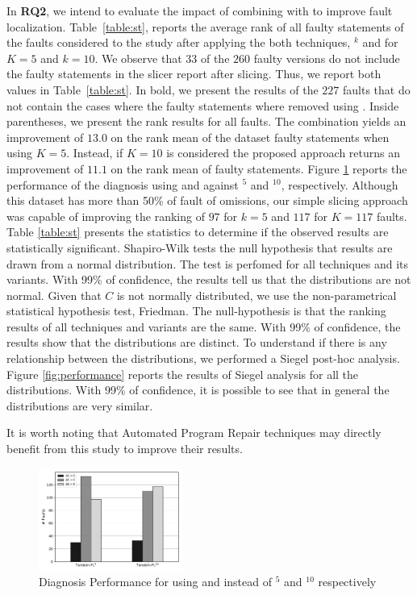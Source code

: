 \documentclass{article}
\begin{document}
In \textbf{RQ2}, we intend to evaluate the impact of combining \ds{} with \sfl{}
to improve fault localization. Table~\ref{table:st}, reports the average rank of all faulty
statements of the \dfj{} faults considered to the study after applying the both
techniques, \sfl{}$^{k}$ and  for $K=5$ and $k=10$. We observe that
$33$ of the $260$ 
faulty versions do not include the faulty statements in the slicer report after slicing.
Thus, we report both values in Table~\ref{table:st}. In bold, we present the
results of the $227$ faults that do not contain the cases where the faulty
statements where removed using . Inside parentheses, we present the
rank results for all faults. The  combination yields an improvement
of $13.0$ on the rank mean of the dataset faulty statements when using $K=5$.
Instead, if $K=10$ is considered the proposed approach returns an improvement of
$11.1$ on the rank mean of faulty statements.
 Figure \ref{fig:diagnosis} reports the performance of the diagnosis
using  and  against \sfl{}$^{5}$ and \sfl{}$^{10}$,
respectively. Although this dataset has more than 50\% of fault of omissions,
our simple slicing approach was capable of improving the ranking of $97$ for
$k=5$ and $117$ for $K=117$ faults. Table \ref{table:st} presents the statistics
to determine if the observed results are statistically significant. Shapiro-Wilk
tests the null hypothesis that results are drawn from a normal distribution. The
test is perfomed for all techniques and its variants. With 99\% of confidence,
the results tell us that the distributions are not normal. Given that $C$ is not
normally distributed, we use the non-parametrical statistical hypothesis test,
Friedman. The null-hypothesis is that the ranking results of all techniques and
variants are the same. With 99\% of confidence, the results show that the
distributions are distinct. To understand if there is any relationship
between the distributions, 
we performed a Siegel post-hoc analysis. Figure
\ref{fig:performance} reports the results of Siegel analysis for all the
distributions. With 99\% of confidence, it is possible to see that in general
the distributions are very similar. 

It is worth noting that Automated
Program Repair techniques may directly benefit from this study to improve their
results.


\begin{figure}[h]
		\centering
		\includegraphics[width=0.42\textwidth]{figures/performance.pdf}
		\caption{Diagnosis Performance for using  and  instead of \sfl{}$^{5}$ and \sfl{}$^{10}$ respectively}
		\label{fig:diagnosis}
\end{figure}
\end{document}
